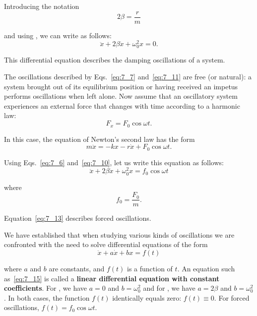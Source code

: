 \noindent
Introducing the notation
\begin{equation}\label{eq:7_10}
	2\beta = \frac{r}{m}
\end{equation}

\noindent
and using , we can write  as follows:
\begin{equation}\label{eq:7_11}
	\ddot{x} + 2\beta\dot{x} + \omega_0^2 x = 0.
\end{equation}

\noindent
This differential equation describes the damping oscillations of a system.

The oscillations described by Eqs.~\eqref{eq:7_7} and~\eqref{eq:7_11} are free (or natural): a system brought out of its equilibrium position or having received an impetus performs oscillations when left alone. Now assume that an oscillatory system experiences an external force that changes with time according to a harmonic law:
\begin{equation}\label{eq:7_12}
	F_x = F_0 \cos\omega t.
\end{equation}

\noindent
In this case, the equation of Newton's second law has the form
\begin{equation*}
	m\ddot{x} = -kx - r\dot{x} + F_0 \cos\omega t.
\end{equation*}

\noindent
Using Eqs.~\eqref{eq:7_6} and~\eqref{eq:7_10}, let us write this equation as follows:
\begin{equation}\label{eq:7_13}
	\ddot{x} + 2\beta\dot{x} +\omega_0^2 x = f_0 \cos\omega t
\end{equation}

\noindent
where
\begin{equation}\label{eq:7_14}
	f_0 = \frac{F_0}{m}.
\end{equation}

\noindent
Equation~\eqref{eq:7_13} describes forced oscillations.

We have established that when studying various kinds of oscillations we are confronted with the need to solve differential equations of the form
\begin{equation}\label{eq:7_15}
	\ddot{x} + a\dot{x} +bx = f(t)
\end{equation}

\noindent
where $a$ and $b$ are constants, and $f(t)$ is a function of $t$. An equation such as~\eqref{eq:7_15} is called a \textbf{linear differential equation with constant coefficients}. For , we have $a=0$ and $b=\omega_0^2$ and for , we have $a=2\beta$ and $b=\omega_0^2$. In both cases, the function $f(t)$ identically equals zero: $f(t)\equiv 0$. For forced oscillations, $f(t)=f_0\cos\omega t$.

